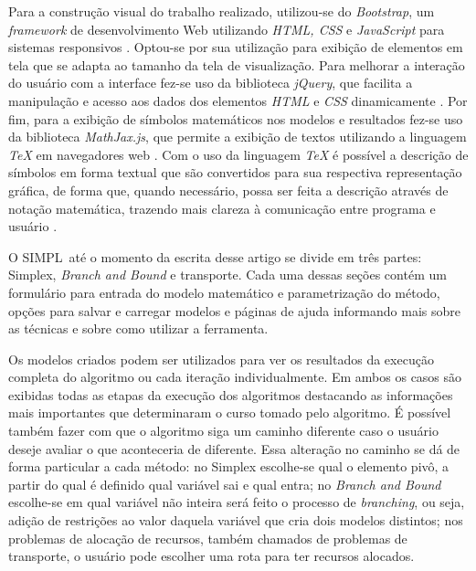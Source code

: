 \documentclass [11pt]{articleSBPO}
\newcommand{\sigla}[0] {SIMPL}
\begin{document}
Para a construção visual do trabalho realizado, utilizou-se do \textit{Bootstrap}, um \textit{framework} de desenvolvimento Web utilizando \textit{HTML, CSS} e \textit{JavaScript} para sistemas responsivos \cite{bootstrap}. Optou-se por sua utilização para exibição de elementos em tela que se adapta ao tamanho da tela de visualização. Para melhorar a interação do usuário com a interface fez-se uso da biblioteca \textit{jQuery}, que facilita a manipulação e acesso aos dados dos elementos \textit{HTML} e \textit{CSS} dinamicamente \cite{jquery}. Por fim, para a exibição de símbolos matemáticos nos modelos e resultados fez-se uso da biblioteca \textit{MathJax.js}, que permite a exibição de textos utilizando a linguagem \textit{TeX} em navegadores web \cite{mathjax}. Com o uso da linguagem \textit{TeX} é possível a descrição de símbolos em forma textual que são convertidos para sua respectiva representação gráfica, de forma que, quando necessário, possa ser feita a descrição através de notação matemática, trazendo mais clareza à comunicação entre programa e usuário \cite{tex}.

O \sigla\ até o momento da escrita desse artigo se divide em três partes: Simplex, \textit{Branch and Bound} e transporte. Cada uma dessas seções contém um formulário para entrada do modelo matemático e parametrização do método, opções para salvar e carregar modelos e páginas de ajuda informando mais sobre as técnicas e sobre como utilizar a ferramenta.

Os modelos criados podem ser utilizados para ver os resultados da execução completa do algoritmo ou cada iteração individualmente. Em ambos os casos são exibidas todas as etapas da execução dos algoritmos destacando as informações mais importantes que determinaram o curso tomado pelo algoritmo. É possível também fazer com que o algoritmo siga um caminho diferente caso o usuário deseje avaliar o que aconteceria de diferente. Essa alteração no caminho se dá de forma particular a cada método: no Simplex escolhe-se qual o elemento pivô, a partir do qual é definido qual variável sai e qual entra; no \textit{Branch and Bound} escolhe-se em qual variável não inteira será feito o processo de \textit{branching}, ou seja, adição de restrições ao valor daquela variável que cria dois modelos distintos; nos problemas de alocação de recursos, também chamados de problemas de transporte, o usuário pode escolher uma rota para ter recursos alocados.
\end{document}
